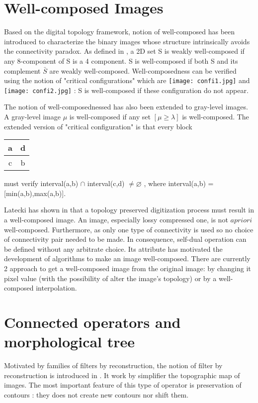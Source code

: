 \section{Well-composed Images} \label{Wellcomposed}
Based on the digital topology framework, notion of well-composed has been introduced to characterize the binary images whose structure intrinsically avoids the connectivity paradox. As defined in \cite{Latecki95}, a 2D set S is weakly well-composed if any 8-component of S is a 4 component. S is well-composed if both S and its complement $\bar{S}$ are weakly well-composed. Well-composedness can be verified  using the notion of "critical configurations" which are \texttt{[image: confi1.jpg]} and \texttt{[image: confi2.jpg]} : S is well-composed if these configuration do not appear. 
\par
The notion of well-composednessed has also been extended to gray-level images. A gray-level image $\mu$ is well-composed if any set $[\mu \geq \lambda ]$ is well-composed. The extended version of "critical configuration" is that every block 
\begin{tabular}{|c|c|}
\hline 
a & d \\ 
\hline 
c & b \\ 
\hline 
\end{tabular} 
must verify interval(a,b) $\cap$ interval(c,d) $\neq \varnothing$ , where interval(a,b) = [min(a,b),max(a,b)].
\par
Latecki has shown in \cite{Latecki.98.JMIV} that a topology preserved digitization process must result in a well-composed image. An image, especially lossy compressed one, is not $a priori$ well-composed. Furthermore, as only one type of connectivity is used so no choice of connectivity pair needed to be made. In consequence, self-dual operation can be defined without any arbitrate choice. Its attribute has motivated the development of algorithms to make an image well-composed. There are currently 2 approach to get a well-composed image from the original image: by changing it pixel value (with the possibility of alter the image's topology) or by a well-composed interpolation.


\section{Connected operators and morphological tree}
Motivated by families of filters by reconstruction, the notion of filter by reconstruction is introduced in \cite{Salembier95flatzones} \cite{Serra1993}. It work by simplifier the topographic map of images. The most important feature of this type of operator is preservation of contours \cite{Salembier2009}: they does not create new contours nor shift them.
